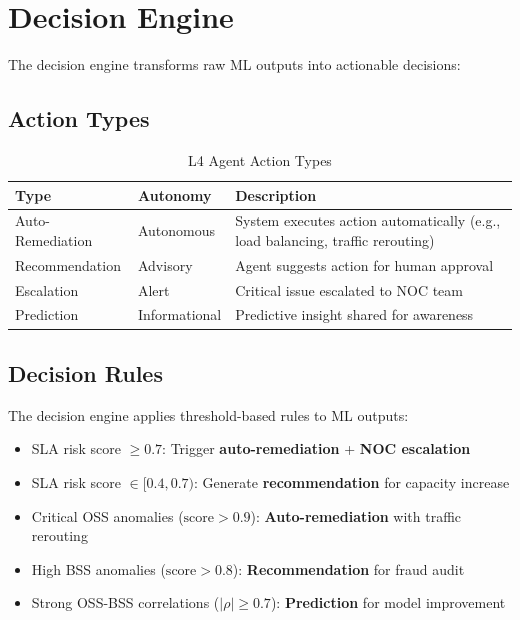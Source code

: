 \section{Decision Engine}

The decision engine transforms raw ML outputs into actionable decisions:

\subsection{Action Types}

\begin{table}[H]
\centering
\caption{L4 Agent Action Types}
\label{tab:action-types}
\begin{tabular}{@{}llp{6cm}@{}}
\toprule
\textbf{Type} & \textbf{Autonomy} & \textbf{Description} \\
\midrule
Auto-Remediation & Autonomous & System executes action automatically (e.g., load balancing, traffic rerouting) \\
Recommendation & Advisory & Agent suggests action for human approval \\
Escalation & Alert & Critical issue escalated to NOC team \\
Prediction & Informational & Predictive insight shared for awareness \\
\bottomrule
\end{tabular}
\end{table}

\subsection{Decision Rules}

The decision engine applies threshold-based rules to ML outputs:

\begin{itemize}
    \item SLA risk score $\geq 0.7$: Trigger \textbf{auto-remediation} + \textbf{NOC escalation}
    \item SLA risk score $\in [0.4, 0.7)$: Generate \textbf{recommendation} for capacity increase
    \item Critical OSS anomalies ($\text{score} > 0.9$): \textbf{Auto-remediation} with traffic rerouting
    \item High BSS anomalies ($\text{score} > 0.8$): \textbf{Recommendation} for fraud audit
    \item Strong OSS-BSS correlations ($|\rho| \geq 0.7$): \textbf{Prediction} for model improvement
\end{itemize}

